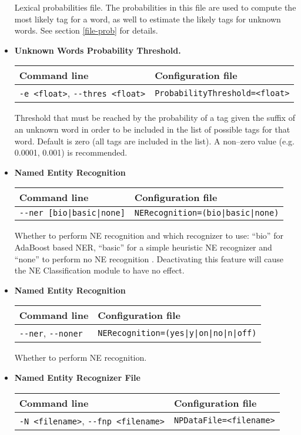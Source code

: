 \documentclass[a4paper]{book}
\begin{document}
\begin{itemize}
 Lexical probabilities file. The probabilities in this file are used
 to compute the most likely tag for a word, as well to estimate the
 likely tags for unknown words. See section \ref{file-prob} for details.

\item {\bf Unknown Words Probability Threshold.}

\begin{tabular}{|l|l|}
Command line       & Configuration file   \\ \hline
\verb#-e <float>#, \verb#--thres <float>#   & \verb#ProbabilityThreshold=<float>#   \\ \hline   
\end{tabular}

 Threshold that must be reached by the probability of a tag given the
 suffix of an unknown word in order to be included in the list of
 possible tags for that word. Default is zero (all tags are included
 in the list). A non--zero value (e.g. 0.0001, 0.001) is recommended.


\item {\bf Named Entity Recognition}

\begin{tabular}{|l|l|}
Command line       & Configuration file   \\ \hline
\verb#--ner [bio|basic|none]#   & \verb#NERecognition=(bio|basic|none)#    \\ \hline
\end{tabular}

  Whether to perform NE recognition and which recognizer to use:
  ``bio'' for AdaBoost based NER, ``basic'' for a simple heuristic NE
  recognizer and ``none'' to perform no NE recognition . Deactivating
  this feature will cause the NE Classification module to have no
  effect.

\item {\bf Named Entity Recognition}

\begin{tabular}{|l|l|}
Command line       & Configuration file   \\ \hline
\verb#--ner#, \verb#--noner#     & \verb#NERecognition=(yes|y|on|no|n|off)#    \\ \hline
\end{tabular}

   Whether to perform NE recognition.

\item {\bf Named Entity Recognizer File}

\begin{tabular}{|l|l|}
Command line       & Configuration file   \\ \hline
\verb#-N <filename>#, \verb#--fnp <filename>#   & \verb#NPDataFile=<filename># \\ \hline
\end{tabular}


\end{itemize}
\end{document}
